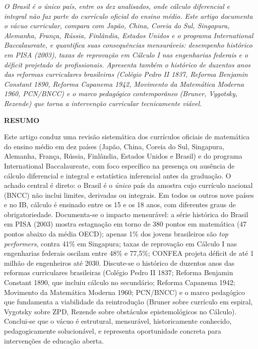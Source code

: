 \documentclass[12pt,a4paper,oneside]{article}
\begin{document}
\begin{titlepage}
\begin{center}
    \begin{minipage}{0.85\textwidth}\centering\small
      \textit{O Brasil é o único país, entre os dez analisados, onde
      cálculo diferencial e integral não faz parte do currículo
      oficial do ensino médio. Este artigo documenta o vácuo
      curricular, compara com Japão, China, Coreia do Sul, Singapura,
      Alemanha, França, Rússia, Finlândia, Estados Unidos e o programa
      International Baccalaureate, e quantifica suas consequências
      mensuráveis: desempenho histórico em PISA (2003),
      taxas de reprovação em Cálculo I nas engenharias federais e o
      déficit projetado de profissionais. Apresenta também o histórico
      de duzentos anos das reformas curriculares brasileiras
      (Colégio Pedro II 1837, Reforma Benjamin Constant 1890,
      Reforma Capanema 1942, Movimento da Matemática Moderna 1960,
      PCN/BNCC) e o marco pedagógico contemporâneo (Bruner, Vygotsky,
      Rezende) que torna a intervenção curricular tecnicamente viável.}
    \end{minipage}

    \vspace{1.5cm}
  \end{center}
\end{titlepage}

\begin{center}
{\bfseries RESUMO}
\end{center}

\noindent
Este artigo conduz uma revisão sistemática dos currículos
oficiais de matemática do ensino médio em dez países (Japão, China,
Coreia do Sul, Singapura, Alemanha, França, Rússia, Finlândia, Estados
Unidos e Brasil) e do programa International Baccalaureate, com foco
específico na presença ou ausência de cálculo diferencial e integral
e estatística inferencial antes da graduação. O achado central é
direto: o Brasil é o \emph{único} país da amostra cujo currículo
nacional (BNCC) não inclui limites, derivadas ou integrais. Em todos
os outros nove países e no IB, cálculo é ensinado entre os 15 e os
18 anos, com diferentes graus de obrigatoriedade. Documenta-se o
impacto mensurável: a série histórica do Brasil em PISA
(2003) mostra estagnação em torno de 380 pontos em
matemática (47 pontos abaixo da média OECD); apenas
1\% dos jovens brasileiros são \emph{top performers}, contra 41\% em
Singapura; taxas de reprovação em Cálculo I nas engenharias federais
oscilam entre 48\% e 77,5\%; CONFEA projeta déficit de até 1 milhão
de engenheiros até 2030. Discute-se o histórico de duzentos anos das
reformas curriculares brasileiras (Colégio Pedro II 1837; Reforma
Benjamin Constant 1890, que incluiu cálculo no
secundário; Reforma Capanema 1942; Movimento da Matemática Moderna
1960; PCN/BNCC) e o marco pedagógico que fundamenta a viabilidade da
reintrodução (Bruner sobre currículo em espiral, Vygotsky sobre
ZPD, Rezende sobre obstáculos epistemológicos no Cálculo). Conclui-se
que o vácuo é estrutural, mensurável, historicamente conhecido,
pedagogicamente solucionável, e representa oportunidade concreta para
intervenções de educação aberta.
\end{document}
